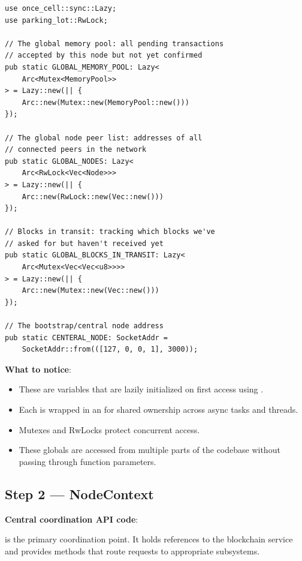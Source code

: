 \begin{listing}[htbp]
\caption{Global state singletons ()}
\label{lst:9-8-1}
\begin{verbatim}
use once_cell::sync::Lazy;
use parking_lot::RwLock;

// The global memory pool: all pending transactions
// accepted by this node but not yet confirmed
pub static GLOBAL_MEMORY_POOL: Lazy<
    Arc<Mutex<MemoryPool>>
> = Lazy::new(|| {
    Arc::new(Mutex::new(MemoryPool::new()))
});

// The global node peer list: addresses of all
// connected peers in the network
pub static GLOBAL_NODES: Lazy<
    Arc<RwLock<Vec<Node>>>
> = Lazy::new(|| {
    Arc::new(RwLock::new(Vec::new()))
});

// Blocks in transit: tracking which blocks we've
// asked for but haven't received yet
pub static GLOBAL_BLOCKS_IN_TRANSIT: Lazy<
    Arc<Mutex<Vec<Vec<u8>>>>
> = Lazy::new(|| {
    Arc::new(Mutex::new(Vec::new()))
});

// The bootstrap/central node address
pub static CENTERAL_NODE: SocketAddr =
    SocketAddr::from(([127, 0, 0, 1], 3000));
\end{verbatim}
\end{listing}

\textbf{What to notice}:
\begin{itemize}
  \item These are  variables that are lazily initialized on first access using .
  \item Each is wrapped in an  for shared ownership across async tasks and threads.
  \item Mutexes and RwLocks protect concurrent access.
  \item These globals are accessed from multiple parts of the codebase without passing through function parameters.
\end{itemize}

\subsection{Step 2 --- NodeContext}
\label{sec:ch09-8-step2}

\textbf{Central coordination API code}: 

 is the primary coordination point. It holds references to the blockchain service and provides methods that route requests to appropriate subsystems.

